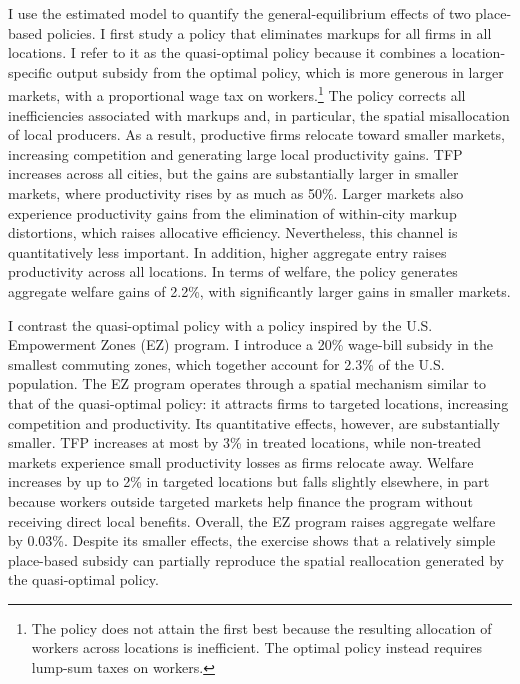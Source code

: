 I use the estimated model to quantify the general-equilibrium effects of two place-based policies. I first study a policy that eliminates markups for all firms in all locations. I refer to it as the quasi-optimal policy because it combines a location-specific output subsidy from the optimal policy, which is more generous in larger markets, with a proportional wage tax on workers.\footnote{The policy does not attain the first best because the resulting allocation of workers across locations is inefficient. The optimal policy instead requires lump-sum taxes on workers.} The policy corrects all inefficiencies associated with markups and, in particular, the spatial misallocation of local producers. As a result, productive firms relocate toward smaller markets, increasing competition and generating large local productivity gains. TFP increases across all cities, but the gains are substantially larger in smaller markets, where productivity rises by as much as 50\%. Larger markets also experience productivity gains from the elimination of within-city markup distortions, which raises allocative efficiency. Nevertheless, this channel is quantitatively less important. In addition, higher aggregate entry raises productivity across all locations. In terms of welfare, the policy generates aggregate welfare gains of 2.2\%, with significantly larger gains in smaller markets.

I contrast the quasi-optimal policy with a policy inspired by the U.S. Empowerment Zones (EZ) program. I introduce a 20\% wage-bill subsidy in the smallest commuting zones, which together account for 2.3\% of the U.S. population. The EZ program operates through a spatial mechanism similar to that of the quasi-optimal policy: it attracts firms to targeted locations, increasing competition and productivity. Its quantitative effects, however, are substantially smaller. TFP increases at most by 3\% in treated locations, while non-treated markets experience small productivity losses as firms relocate away. Welfare increases by up to 2\% in targeted locations but falls slightly elsewhere, in part because workers outside targeted markets help finance the program without receiving direct local benefits. Overall, the EZ program raises aggregate welfare by 0.03\%. Despite its smaller effects, the exercise shows that a relatively simple place-based subsidy can partially reproduce the spatial reallocation generated by the quasi-optimal policy.

